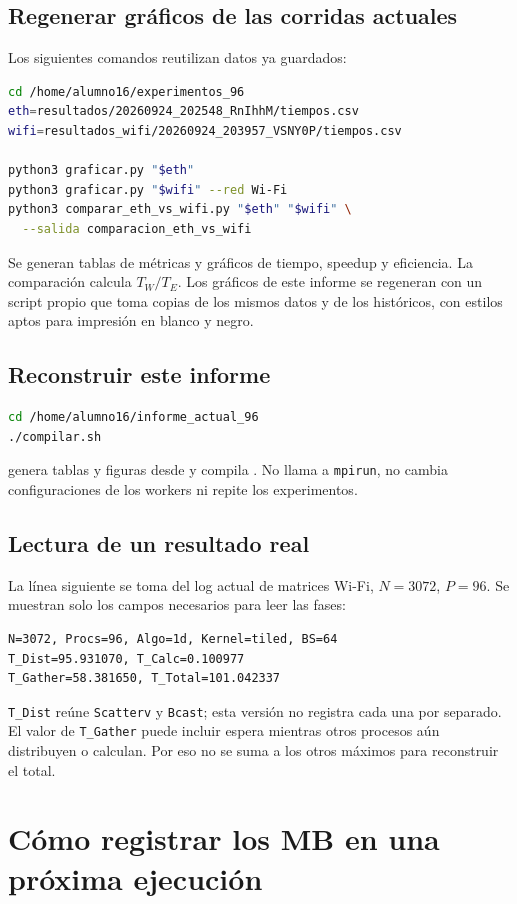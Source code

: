 \clearpage
\subsection{Regenerar gráficos de las corridas actuales}
Los siguientes comandos reutilizan datos ya guardados:
\begin{lstlisting}[language=bash]
cd /home/alumno16/experimentos_96
eth=resultados/20260924_202548_RnIhhM/tiempos.csv
wifi=resultados_wifi/20260924_203957_VSNY0P/tiempos.csv

python3 graficar.py "$eth"
python3 graficar.py "$wifi" --red Wi-Fi
python3 comparar_eth_vs_wifi.py "$eth" "$wifi" \
  --salida comparacion_eth_vs_wifi
\end{lstlisting}
Se generan tablas de métricas y gráficos de tiempo, speedup y eficiencia. La comparación calcula $T_W/T_E$. Los gráficos de este informe se regeneran con un script propio que toma copias de los mismos datos y de los históricos, con estilos aptos para impresión en blanco y negro.

\subsection{Reconstruir este informe}
\begin{lstlisting}[language=bash]
cd /home/alumno16/informe_actual_96
./compilar.sh
\end{lstlisting}
 genera tablas y figuras desde  y compila . No llama a \texttt{mpirun}, no cambia configuraciones de los workers ni repite los experimentos.

\subsection{Lectura de un resultado real}
La línea siguiente se toma del log actual de matrices Wi-Fi, $N=3072$, $P=96$. Se muestran solo los campos necesarios para leer las fases:
\begin{lstlisting}
N=3072, Procs=96, Algo=1d, Kernel=tiled, BS=64
T_Dist=95.931070, T_Calc=0.100977
T_Gather=58.381650, T_Total=101.042337
\end{lstlisting}
\texttt{T\_Dist} reúne \texttt{Scatterv} y \texttt{Bcast}; esta versión no registra cada una por separado. El valor de \texttt{T\_Gather} puede incluir espera mientras otros procesos aún distribuyen o calculan. Por eso no se suma a los otros máximos para reconstruir el total.

\clearpage
\section{Cómo registrar los MB en una próxima ejecución}

